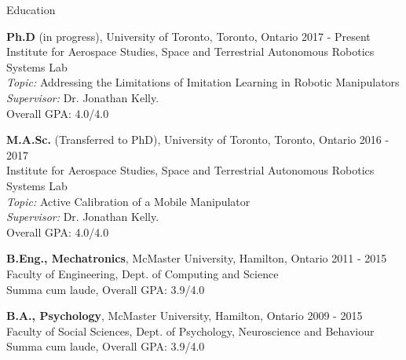 \documentclass[usenames, dvipsnames]{resume} %
\begin{document}
	
\vspace{-2.5cm}


%


\begin{rSection}{Education}

\textbf{Ph.D} (in progress), University of Toronto, Toronto, Ontario \hfill {2017 - Present} \\
Institute for Aerospace Studies, Space and Terrestrial Autonomous Robotics Systems Lab \smallskip \\
\textit{Topic:} Addressing the Limitations of Imitation Learning in Robotic Manipulators \\
\textit{Supervisor:} Dr. Jonathan Kelly. \smallskip \\
Overall GPA: 4.0/4.0

\textbf{M.A.Sc.} (Transferred to PhD), University of Toronto, Toronto, Ontario \hfill {2016 - 2017} \\
Institute for Aerospace Studies, Space and Terrestrial Autonomous Robotics Systems Lab \smallskip \\
\textit{Topic:} Active Calibration of a Mobile Manipulator \\
\textit{Supervisor:} Dr. Jonathan Kelly. \smallskip \\
Overall GPA: 4.0/4.0

\textbf{B.Eng., Mechatronics}, McMaster University, Hamilton, Ontario \hfill {2011 - 2015} \\
Faculty of Engineering, Dept. of Computing and Science \smallskip \\
Summa cum laude, Overall GPA: 3.9/4.0

\textbf{B.A., Psychology}, McMaster University, Hamilton, Ontario \hfill {2009 - 2015} \\
Faculty of Social Sciences, Dept. of Psychology, Neuroscience and Behaviour \smallskip \\
Summa cum laude, Overall GPA: 3.9/4.0

\end{rSection}

\end{document}
